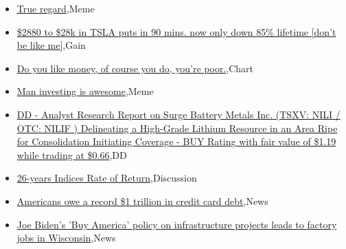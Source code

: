 \documentclass{article}%
\begin{document}
%
\begin{itemize}%
\item%
\href{https://reddit.com/r/wallstreetbets/comments/15is2h4/true\_regard/}{True regard},Meme%
\item%
\href{https://reddit.com/r/wallstreetbets/comments/15iozyo/2880\_to\_28k\_in\_tsla\_puts\_in\_90\_mins\_now\_only\_down/}{\$2880 to \$28k in TSLA puts in 90 mins. now only down 85\% lifetime [don't be like me]},Gain%
\item%
\href{https://reddit.com/r/wallstreetbets/comments/15iorgk/do\_you\_like\_money\_of\_course\_you\_do\_youre\_poor/}{Do you like money, of course you do, you're poor.},Chart%
\item%
\href{https://reddit.com/r/wallstreetbets/comments/15inx9g/man\_investing\_is\_awesome/}{Man investing is awesome},Meme%
\item%
\href{https://reddit.com/r/Baystreetbets/comments/15i9jti/dd\_analyst\_research\_report\_on\_surge\_battery/}{DD - Analyst Research Report on Surge Battery Metals Inc. (TSXV: NILI / OTC: NILIF ) Delineating a High-Grade Lithium Resource in an Area Ripe for Consolidation  Initiating Coverage - BUY Rating with fair value of \$1.19 while trading at \$0.66},DD%
\item%
\href{https://reddit.com/r/StockMarket/comments/15iaybg/26years\_indices\_rate\_of\_return/}{26-years Indices Rate of Return},Discussion%
\item%
\href{https://reddit.com/r/Economics/comments/15isaa4/americans\_owe\_a\_record\_1\_trillion\_in\_credit\_card/}{Americans owe a record \$1 trillion in credit card debt},News%
\item%
\href{https://reddit.com/r/Economics/comments/15iii1a/joe\_bidens\_buy\_america\_policy\_on\_infrastructure/}{Joe Biden's 'Buy America' policy on infrastructure projects leads to factory jobs in Wisconsin},News%
\end{itemize}%
\end{document}
